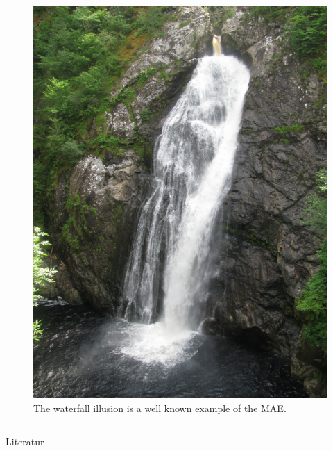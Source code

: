 \documentclass[xcolor={fixpdftex,hyperref,x11names},10pt,pdftex,hyperref={pdftex}]{beamer}
\begin{document}
\begin{frame}
\begin{columns}[t]
\begin{column}{0.3\textwidth}
\begin{figure}[h]
          \includegraphics[width=\textwidth]{./figs/waterfall.png}
          \caption{The waterfall illusion is a well known example of the MAE.}
          \label{fig:waterfall}
        \end{figure}
      \end{column}
  \end{columns}
\end{frame}

\begin{frame}{Literatur}
    \nocite{kanai_perceptual_2005}
    
    
    \normalsize%
\end{frame}
\end{document}
